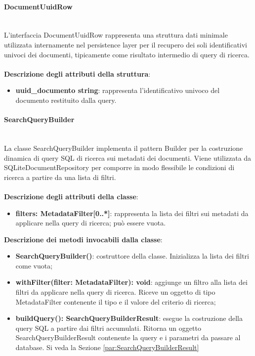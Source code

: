 \documentclass[a4paper,12pt]{article}
\begin{document}
{{{                \paragraph{DocumentUuidRow}\label{par:DocumentUuidRow}\mbox{}\\
                L'interfaccia DocumentUuidRow rappresenta una struttura dati minimale utilizzata internamente nel persistence layer per il recupero dei soli identificativi univoci dei documenti, tipicamente come risultato intermedio di query di ricerca.\\
                \\
                \textbf{Descrizione degli attributi della struttura}:
                \begin{itemize}
                    \item \textbf{uuid\_documento string}: rappresenta l'identificativo univoco del documento restituito dalla query.
                \end{itemize}
                \paragraph{SearchQueryBuilder}\label{par:SearchQueryBuilder}\mbox{}\\
                La classe SearchQueryBuilder implementa il pattern Builder per la costruzione dinamica di query SQL di ricerca sui metadati dei documenti. Viene utilizzata da SQLiteDocumentRepository per comporre in modo flessibile le condizioni di ricerca a partire da una lista di filtri.\\
                \\
                \textbf{Descrizione degli attributi della classe}:
                \begin{itemize}
                    \item \textbf{filters: MetadataFilter[0..*]}: rappresenta la lista dei filtri sui metadati da applicare nella query di ricerca; può essere vuota.
                \end{itemize}
 
              \noindent \textbf{Descrizione dei metodi invocabili dalla classe}:
                \begin{itemize}
                    \item \textbf{SearchQueryBuilder()}: costruttore della classe. Inizializza la lista dei filtri come vuota;
                    \item \textbf{withFilter(filter: MetadataFilter): void}: aggiunge un filtro alla lista dei filtri da applicare nella query di ricerca. Riceve un oggetto di tipo MetadataFilter contenente il tipo e il valore del criterio di ricerca;
                    \item \textbf{buildQuery(): SearchQueryBuilderResult}: esegue la costruzione della query SQL a partire dai filtri accumulati. Ritorna un oggetto SearchQueryBuilderResult contenente la query e i parametri da passare al database. Si veda la Sezione \ref{par:SearchQueryBuilderResult}
                \end{itemize}
}}}
\end{document}
